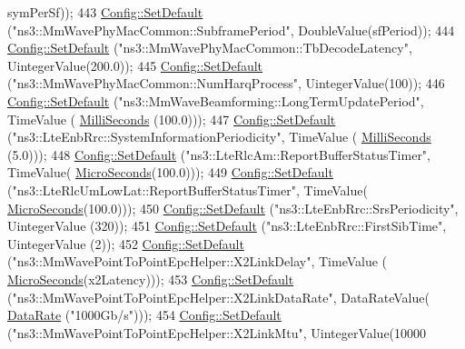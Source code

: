\begin{DoxyCode}
{      symPerSf));
443   \hyperlink{group__config_ga2e7882df849d8ba4aaad31c934c40c06}{Config::SetDefault} (\textcolor{stringliteral}{"ns3::MmWavePhyMacCommon::SubframePeriod"}, DoubleValue(sfPeriod));
444   \hyperlink{group__config_ga2e7882df849d8ba4aaad31c934c40c06}{Config::SetDefault} (\textcolor{stringliteral}{"ns3::MmWavePhyMacCommon::TbDecodeLatency"}, UintegerValue(200.0));
445   \hyperlink{group__config_ga2e7882df849d8ba4aaad31c934c40c06}{Config::SetDefault} (\textcolor{stringliteral}{"ns3::MmWavePhyMacCommon::NumHarqProcess"}, UintegerValue(100));
446   \hyperlink{group__config_ga2e7882df849d8ba4aaad31c934c40c06}{Config::SetDefault} (\textcolor{stringliteral}{"ns3::MmWaveBeamforming::LongTermUpdatePeriod"}, TimeValue (
      \hyperlink{group__timecivil_gaf26127cf4571146b83a92ee18679c7a9}{MilliSeconds} (100.0)));
447   \hyperlink{group__config_ga2e7882df849d8ba4aaad31c934c40c06}{Config::SetDefault} (\textcolor{stringliteral}{"ns3::LteEnbRrc::SystemInformationPeriodicity"}, TimeValue (
      \hyperlink{group__timecivil_gaf26127cf4571146b83a92ee18679c7a9}{MilliSeconds} (5.0)));
448   \hyperlink{group__config_ga2e7882df849d8ba4aaad31c934c40c06}{Config::SetDefault} (\textcolor{stringliteral}{"ns3::LteRlcAm::ReportBufferStatusTimer"}, TimeValue(
      \hyperlink{group__timecivil_ga17465a639c8d1464e76538afdd78a9f0}{MicroSeconds}(100.0)));
449   \hyperlink{group__config_ga2e7882df849d8ba4aaad31c934c40c06}{Config::SetDefault} (\textcolor{stringliteral}{"ns3::LteRlcUmLowLat::ReportBufferStatusTimer"}, TimeValue(
      \hyperlink{group__timecivil_ga17465a639c8d1464e76538afdd78a9f0}{MicroSeconds}(100.0)));
450   \hyperlink{group__config_ga2e7882df849d8ba4aaad31c934c40c06}{Config::SetDefault} (\textcolor{stringliteral}{"ns3::LteEnbRrc::SrsPeriodicity"}, UintegerValue (320));
451   \hyperlink{group__config_ga2e7882df849d8ba4aaad31c934c40c06}{Config::SetDefault} (\textcolor{stringliteral}{"ns3::LteEnbRrc::FirstSibTime"}, UintegerValue (2));
452   \hyperlink{group__config_ga2e7882df849d8ba4aaad31c934c40c06}{Config::SetDefault} (\textcolor{stringliteral}{"ns3::MmWavePointToPointEpcHelper::X2LinkDelay"}, TimeValue (
      \hyperlink{group__timecivil_ga17465a639c8d1464e76538afdd78a9f0}{MicroSeconds}(x2Latency)));
453   \hyperlink{group__config_ga2e7882df849d8ba4aaad31c934c40c06}{Config::SetDefault} (\textcolor{stringliteral}{"ns3::MmWavePointToPointEpcHelper::X2LinkDataRate"}, DataRateValue(
      \hyperlink{classns3_1_1DataRate}{DataRate} (\textcolor{stringliteral}{"1000Gb/s"})));
454   \hyperlink{group__config_ga2e7882df849d8ba4aaad31c934c40c06}{Config::SetDefault} (\textcolor{stringliteral}{"ns3::MmWavePointToPointEpcHelper::X2LinkMtu"},  UintegerValue(10000
}
\end{DoxyCode}
